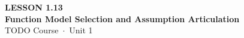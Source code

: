 \documentclass[aspectratio=169, 11pt]{beamer}
\begin{document}
{
\begin{frame}[plain]
  \vspace{2.8cm}\hspace{0.55cm}%
  \begin{minipage}{0.9\textwidth}
    {\color{goldacc}\bfseries\small LESSON 1.13}\\[0.5cm]
    {\color{white}\bfseries\LARGE Function Model Selection and Assumption Articulation}\\[1.2cm]
    {\color{skymid}\small TODO Course~$\cdot$~Unit 1}
  \end{minipage}
\end{frame}
}

\begin{frame}[t, plain]
\end{frame}
\end{document}
